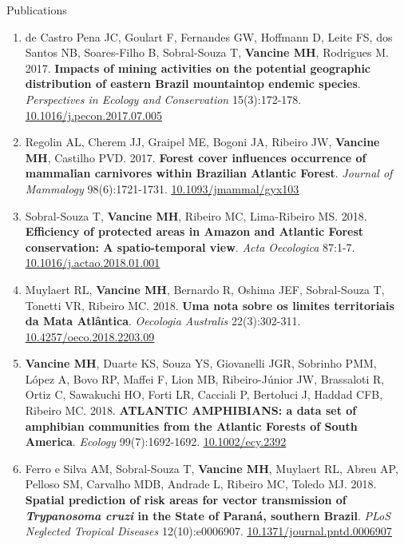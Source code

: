\documentclass{resume}
\begin{document}
\begin{rSection}{Publications}
\begin{enumerate}
\item de Castro Pena JC, Goulart F, Fernandes GW, Hoffmann D, Leite FS, dos Santos NB, Soares-Filho B, Sobral-Souza T, {\bf Vancine MH}, Rodrigues M. 2017. {\bf Impacts of mining activities on the potential geographic distribution of eastern Brazil mountaintop endemic species}. {\it Perspectives in Ecology and Conservation} 15(3):172-178. \href{https://doi.org/10.1016/j.pecon.2017.07.005}{\underline{10.1016/j.pecon.2017.07.005}}

\item Regolin AL, Cherem JJ, Graipel ME, Bogoni JA, Ribeiro JW, {\bf Vancine MH}, Castilho PVD. 2017. {\bf Forest cover influences occurrence of mammalian carnivores within Brazilian Atlantic Forest}. {\it Journal of Mammalogy} 98(6):1721-1731. \href{https://doi.org/10.1093/jmammal/gyx103}{\underline{10.1093/jmammal/gyx103}}

\item Sobral-Souza T, {\bf Vancine MH}, Ribeiro MC, Lima-Ribeiro MS. 2018. {\bf Efficiency of protected areas in Amazon and Atlantic Forest conservation: A spatio-temporal view}. {\it Acta Oecologica} 87:1-7. \href{https://doi.org/10.1016/j.actao.2018.01.001}{\underline{10.1016/j.actao.2018.01.001}}

\item Muylaert RL, {\bf Vancine MH}, Bernardo R, Oshima JEF, Sobral-Souza T, Tonetti VR, Ribeiro MC. 2018. {\bf Uma nota sobre os limites territoriais da Mata Atlântica}. {\it Oecologia Australis} 22(3):302-311. \href{https://doi.org/10.4257/oeco.2018.2203.09}{\underline{10.4257/oeco.2018.2203.09}}

\item {\bf Vancine MH}, Duarte KS, Souza YS, Giovanelli JGR, Sobrinho PMM, López A, Bovo RP, Maffei F, Lion MB, Ribeiro-Júnior JW, Brassaloti R, Ortiz C, Sawakuchi HO, Forti LR, Cacciali P, Bertoluci J, Haddad CFB, Ribeiro MC. 2018. {\bf ATLANTIC AMPHIBIANS: a data set of amphibian communities from the Atlantic Forests of South America}. {\it Ecology} 99(7):1692-1692. \href{https://doi.org/10.1002/ecy.2392}{\underline{10.1002/ecy.2392}}

\item Ferro e Silva AM, Sobral-Souza T, {\bf Vancine MH}, Muylaert RL, Abreu AP, Pelloso SM, Carvalho MDB, Andrade L, Ribeiro MC, Toledo MJ. 2018. {\bf Spatial prediction of risk areas for vector transmission of \textbf{\textit{Trypanosoma cruzi}} in the State of Paraná, southern Brazil}. {\it PLoS Neglected Tropical Diseases} 12(10):e0006907. \href{https://doi.org/10.1371/journal.pntd.0006907}{\underline{10.1371/journal.pntd.0006907}}


\end{enumerate}
\end{rSection}
\end{document}
